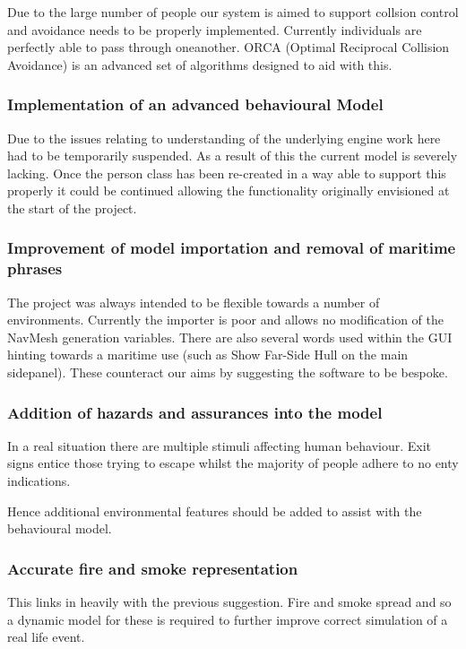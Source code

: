 Due to the large number of people our system is aimed to support collsion
control and avoidance needs to be properly implemented. Currently
individuals are perfectly able to pass through oneanother. ORCA (Optimal
Reciprocal Collision Avoidance) \cite{ORCA} is an advanced set of algorithms designed
to aid with this.


\subsubsection{Implementation of an advanced behavioural Model}

Due to the issues relating to understanding of the underlying engine
work here had to be temporarily suspended. As a result of this the
current model is severely lacking. Once the person class has been
re-created in a way able to support this properly it could be continued
allowing the functionality originally envisioned at the start of the
project.


\subsubsection{Improvement of model importation and removal of maritime phrases}

The project was always intended to be flexible towards a number of
environments. Currently the importer is poor and allows no modification
of the NavMesh generation variables. There are also several words
used within the GUI hinting towards a maritime use (such as Show Far-Side
Hull on the main sidepanel). These counteract our aims by suggesting
the software to be bespoke.


\subsubsection{Addition of hazards and assurances into the model}

In a real situation there are multiple stimuli affecting human behaviour.
Exit signs entice those trying to escape whilst the majority of people
adhere to no enty indications.

Hence additional environmental features should be added to assist
with the behavioural model.


\subsubsection{Accurate fire and smoke representation}

This links in heavily with the previous suggestion. Fire and smoke
spread and so a dynamic model for these is required to further improve
correct simulation of a real life event.

